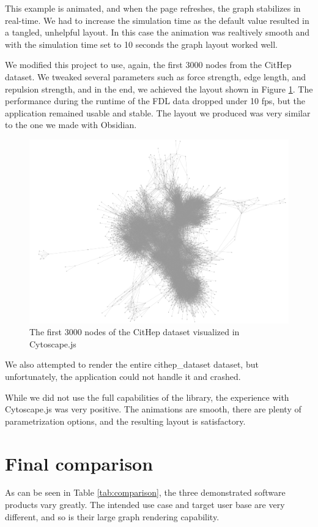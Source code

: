 This example is animated, and when the page refreshes, the graph stabilizes in real-time.
We had to increase the simulation time as the default value resulted in a tangled, unhelpful layout.
In this case the animation was realtively smooth and with the simulation time set to 10 seconds the graph layout worked well.

We modified this project to use, again, the first 3000 nodes from the CitHep dataset.
We tweaked several parameters such as force strength, edge length, and repulsion strength, and in the end, we achieved the layout shown in Figure \ref{obr:cytoscape_3000_nodes}.
The performance during the runtime of the FDL data dropped under 10 \gls{fps}, but the application remained usable and stable.
The layout we produced was very similar to the one we made with Obsidian.

\begin{figure}[p]\centering
  \includegraphics[width=140mm, keepaspectratio]{img/cytoscapejs_cithep_first_3000_nodes.png}
  \caption{The first 3000 nodes of the CitHep dataset visualized in Cytoscape.js}
  \label{obr:cytoscape_3000_nodes}
\end{figure}
We also attempted to render the entire \gls{cithep_dataset} dataset, but unfortunately, the application could not handle it and crashed.

While we did not use the full capabilities of the library, the experience with Cytoscape.js was very positive.
The animations are smooth, there are plenty of parametrization options, and the resulting layout is satisfactory.

\section{Final comparison}
As can be seen in Table \ref{tab:comparison}, the three demonstrated software products vary greatly.
The intended use case and target user base are very different, and so is their large graph rendering capability.

